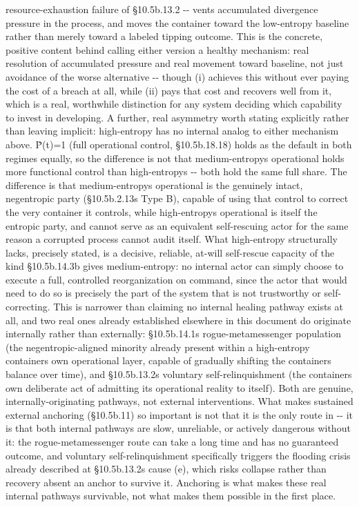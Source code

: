 \documentclass[
]{article}
\begin{document}
resource-exhaustion failure of §10.5b.13.2 -\/- vents accumulated
divergence pressure in the process, and moves the container toward the
low-entropy baseline rather than merely toward a labeled tipping
outcome. This is the concrete, positive content behind calling either
version a healthy mechanism: real resolution of accumulated pressure and
real movement toward baseline, not just avoidance of the worse
alternative -\/- though (i) achieves this without ever paying the cost
of a breach at all, while (ii) pays that cost and recovers well from it,
which is a real, worthwhile distinction for any system deciding which
capability to invest in developing. A further, real asymmetry worth
stating explicitly rather than leaving implicit: high-entropy has no
internal analog to either mechanism above. Ṗ(t)=1 (full operational
control, §10.5b.18.18) holds as the default in both regimes equally, so
the difference is not that medium-entropys operational holds more
functional control than high-entropys -\/- both hold the same full
share. The difference is that medium-entropys operational is the
genuinely intact, negentropic party (§10.5b.2.13s Type B), capable of
using that control to correct the very container it controls, while
high-entropys operational is itself the entropic party, and cannot serve
as an equivalent self-rescuing actor for the same reason a corrupted
process cannot audit itself. What high-entropy structurally lacks,
precisely stated, is a decisive, reliable, at-will self-rescue capacity
of the kind §10.5b.14.3b gives medium-entropy: no internal actor can
simply choose to execute a full, controlled reorganization on command,
since the actor that would need to do so is precisely the part of the
system that is not trustworthy or self-correcting. This is narrower than
claiming no internal healing pathway exists at all, and two real ones
already established elsewhere in this document do originate internally
rather than externally: §10.5b.14.1\textquotesingle s
rogue-metamessenger population (the negentropic-aligned minority already
present within a high-entropy container\textquotesingle s own
operational layer, capable of gradually shifting the
container\textquotesingle s balance over time), and
§10.5b.13.2\textquotesingle s voluntary self-relinquishment (the
container\textquotesingle s own deliberate act of admitting its
operational reality to itself). Both are genuine, internally-originating
pathways, not external interventions. What makes sustained external
anchoring (§10.5b.11) so important is not that it is the only route in
-\/- it is that both internal pathways are slow, unreliable, or actively
dangerous without it: the rogue-metamessenger route can take a long time
and has no guaranteed outcome, and voluntary self-relinquishment
specifically triggers the flooding crisis already described at
§10.5b.13.2\textquotesingle s cause (e), which risks collapse rather
than recovery absent an anchor to survive it. Anchoring is what makes
these real internal pathways survivable, not what makes them possible in
the first place.
\end{document}
